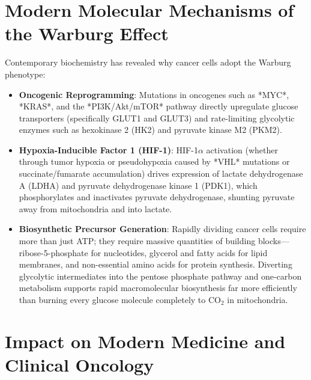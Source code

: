 \section{Modern Molecular Mechanisms of the Warburg Effect}

Contemporary biochemistry has revealed why cancer cells adopt the Warburg phenotype:
\begin{itemize}
    \item \textbf{Oncogenic Reprogramming}: Mutations in oncogenes such as *MYC*, *KRAS*, and the *PI3K/Akt/mTOR* pathway directly upregulate glucose transporters (specifically GLUT1 and GLUT3) and rate-limiting glycolytic enzymes such as hexokinase 2 (HK2) and pyruvate kinase M2 (PKM2).
    \item \textbf{Hypoxia-Inducible Factor 1 (HIF-1)}: HIF-1$\alpha$ activation (whether through tumor hypoxia or pseudohypoxia caused by *VHL* mutations or succinate/fumarate accumulation) drives expression of lactate dehydrogenase A (LDHA) and pyruvate dehydrogenase kinase 1 (PDK1), which phosphorylates and inactivates pyruvate dehydrogenase, shunting pyruvate away from mitochondria and into lactate.
    \item \textbf{Biosynthetic Precursor Generation}: Rapidly dividing cancer cells require more than just ATP; they require massive quantities of building blocks—ribose-5-phosphate for nucleotides, glycerol and fatty acids for lipid membranes, and non-essential amino acids for protein synthesis. Diverting glycolytic intermediates into the pentose phosphate pathway and one-carbon metabolism supports rapid macromolecular biosynthesis far more efficiently than burning every glucose molecule completely to $\text{CO}_2$ in mitochondria.
\end{itemize}

\section{Impact on Modern Medicine and Clinical Oncology}

